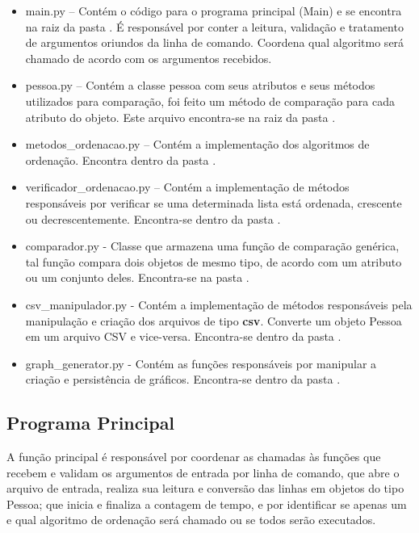 \documentclass[a4paper,12pt]{scrartcl}
\begin{document}
\begin{itemize}
	\item main.py – Contém o código para o programa principal (Main) e se encontra na raiz da pasta . É responsável por conter a leitura, validação e tratamento de argumentos oriundos da linha de comando. Coordena qual algoritmo será chamado de acordo com os argumentos recebidos.
	
	\item pessoa.py – Contém a classe pessoa com seus atributos e seus métodos utilizados para comparação, foi feito um método de comparação para cada atributo do objeto. Este arquivo encontra-se na raiz da pasta .
	
	\item metodos\_ordenacao.py – Contém a implementação dos algoritmos de ordenação. Encontra dentro da pasta .
	
	\item verificador\_ordenacao.py – Contém a implementação de métodos responsáveis por verificar se uma determinada lista está ordenada, crescente ou decrescentemente. Encontra-se dentro da pasta .
	
	\item comparador.py - Classe que armazena uma função de comparação genérica, tal função compara dois objetos de mesmo tipo, de acordo com um atributo ou um conjunto deles. Encontra-se na pasta .
	
	\item csv\_manipulador.py - Contém a implementação de métodos responsáveis pela manipulação e criação dos arquivos de tipo \textbf{csv}. Converte um objeto Pessoa em um arquivo CSV e vice-versa. Encontra-se dentro da pasta .
	
    \item graph\_generator.py - Contém as funções responsáveis por manipular a criação e persistência de gráficos. Encontra-se dentro da pasta .
\end{itemize}

\subsection{Programa Principal}
A função principal é responsável por coordenar as chamadas às funções que recebem e validam os argumentos de entrada por linha de comando, que abre o arquivo de entrada, realiza sua leitura e conversão das linhas em objetos do tipo Pessoa; que inicia e finaliza a contagem de tempo, e por identificar se apenas um e qual algoritmo de ordenação será chamado ou se todos serão executados.
\end{document}
